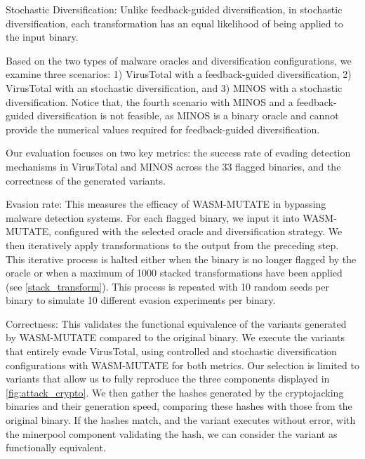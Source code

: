 \begin{definition}{Stochastic Diversification:}
    \label{uncontrolled_def}
    Unlike feedback-guided diversification, in stochastic diversification, each transformation has an equal likelihood of being applied to the input \Wasm binary.
\end{definition}


Based on the two types of malware oracles and diversification configurations, we examine three scenarios:
1) VirusTotal with a feedback-guided diversification, 2) VirusTotal with an stochastic diversification, and 3) MINOS with a stochastic diversification.
Notice that, the fourth scenario with MINOS and a feedback-guided diversification is not feasible, as MINOS is a binary oracle and cannot provide the numerical values required for feedback-guided diversification.

Our evaluation focuses on two key metrics: the success rate of evading detection mechanisms in VirusTotal and MINOS across the 33 flagged binaries, and the correctness of the generated variants.

\begin{definition}{Evasion rate:} This measures the efficacy of WASM-MUTATE in bypassing malware detection systems. 
    For each flagged binary, we input it into WASM-MUTATE, configured with the selected oracle and diversification strategy. 
    We then iteratively apply transformations to the output from the preceding step. 
    This iterative process is halted either when the binary is no longer flagged by the oracle or when a maximum of 1000 stacked transformations have been applied (see \autoref{stack_transform}).
    This process is repeated with 10 random seeds per binary to simulate 10 different evasion experiments per binary.
\end{definition}

\begin{definition}{Correctness:} This validates the functional equivalence of the variants generated by WASM-MUTATE compared to the original binary. 
    We execute the variants that entirely evade VirusTotal, using controlled and stochastic diversification configurations with WASM-MUTATE for both metrics. 
    Our selection is limited to variants that allow us to fully reproduce the three components displayed in \autoref{fig:attack_crypto}. 
    We then gather the hashes generated by the cryptojacking binaries and their generation speed, comparing these hashes with those from the original binary. 
    If the hashes match, and the variant executes without error, with the minerpool component validating the hash, we can consider the variant as functionally equivalent.
\end{definition}

